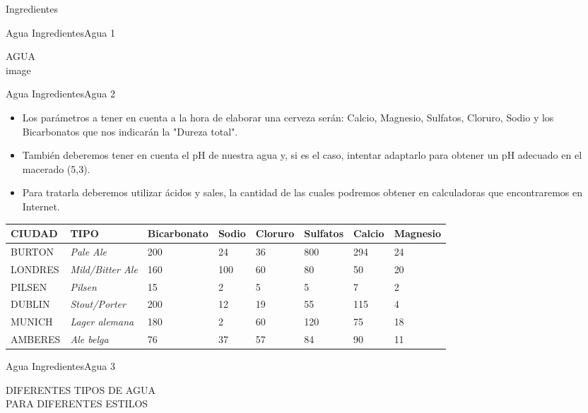 \begin{frame}{Ingredientes}
\protect\hypertarget{ingredientes}{}
\begin{block}{Agua}
\protect\hypertarget{agua}{}
IngredientesAgua 1

AGUA\\
{image}

\begin{block}{Agua}
\protect\hypertarget{agua-1}{}
IngredientesAgua 2

\begin{itemize}
\item
  Los parámetros a tener en cuenta a la hora de elaborar una cerveza
  serán: Calcio, Magnesio, Sulfatos, Cloruro, Sodio y los Bicarbonatos
  que nos indicarán la "Dureza total".
\item
  También deberemos tener en cuenta el pH de nuestra agua y, si es el
  caso, intentar adaptarlo para obtener un pH adecuado en el macerado
  (5,3).
\item
  Para tratarla deberemos utilizar ácidos y sales, la cantidad de las
  cuales podremos obtener en calculadoras que encontraremos en Internet.
\end{itemize}

\begin{longtable}[]{@{}llllllll@{}}
\toprule
\textbf{CIUDAD} & \textbf{TIPO} & \textbf{Bicarbonato} & \textbf{Sodio}
& \textbf{Cloruro} & \textbf{Sulfatos} & \textbf{Calcio} &
\textbf{Magnesio} \\
\midrule
\endhead
BURTON & \emph{Pale Ale} & 200 & 24 & 36 & 800 & 294 & 24 \\
LONDRES & \emph{Mild/Bitter Ale} & 160 & 100 & 60 & 80 & 50 & 20 \\
PILSEN & \emph{Pilsen} & 15 & 2 & 5 & 5 & 7 & 2 \\
DUBLIN & \emph{Stout/Porter} & 200 & 12 & 19 & 55 & 115 & 4 \\
MUNICH & \emph{Lager alemana} & 180 & 2 & 60 & 120 & 75 & 18 \\
AMBERES & \emph{Ale belga} & 76 & 37 & 57 & 84 & 90 & 11 \\
\bottomrule
\end{longtable}
\end{block}
\end{block}

\begin{block}{Agua}
\protect\hypertarget{agua-2}{}
IngredientesAgua 3

DIFERENTES TIPOS DE AGUA\\
PARA DIFERENTES ESTILOS


\end{block}
\end{frame}
